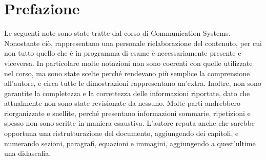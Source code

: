 \section*{Prefazione}
Le seguenti note sono state tratte dal corso di Communication Systems. 
Nonostante ciò, rappresentano una personale rielaborazione del contenuto, per cui non tutto quello che è in programma di esame è necessariamente presente e viceversa.
In particolare molte notazioni non sono coerenti con quelle utilizzate nel corso, ma sono state scelte perché rendevano più semplice la comprensione all'autore, e circa tutte le dimostrazioni rappresentano un'extra.
Inoltre, non sono garantite la completezza e la correttezza delle informazioni riportate, dato che attualmente non sono state revisionate da nessuno. 
Molte parti andrebbero riorganizzate e snellite, perché presentano informazioni sommarie, ripetizioni e spesso non sono scritte in maniera esaustiva.
L'autore reputa anche che sarebbe opportuna una ristrutturazione del documento, aggiungendo dei capitoli, e numerando sezioni, paragrafi, equazioni e immagini, aggiungendo a quest'ultime una didascalia.

